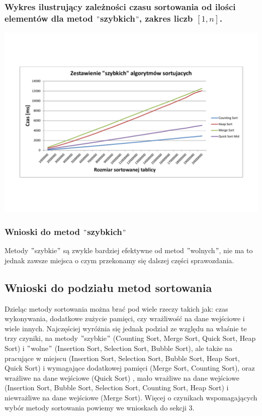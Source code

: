 \documentclass[polish,polish,a4paper]{article}
\begin{document}
\begin{spacing}{1.5}
\subsubsection*{Wykres ilustrujący zależności czasu sortowania od ilości elementów dla metod $"$szybkich$"$, zakres liczb $ [1,n] $.}

	\begin{minipage}[H]{\textwidth}
	\begin{center}
		\includegraphics[scale=0.6]{zad2szybkie.pdf}
		\label{fig:zad2szybkie}
	\end{center}
\end{minipage}

\subsubsection{Wnioski do metod $"$szybkich$"$}

Metody $"$szybkie$"$ są zwykle bardziej efektywne od metod $"$wolnych$"$, nie ma to jednak zawsze miejsca o czym przekonamy się dalszej części sprawozdania.


\subsection{Wnioski do podziału metod sortowania}

Dzieląc metody sortowania można brać pod wiele rzeczy takich jak: czas wykonywania, dodatkowe zużycie pamięci, czy wrażliwość na dane wejściowe i wiele innych. Najczęściej wyróżnia się jednak podział ze względu na właśnie te trzy czyniki, na metody $ " $szybkie$ " $ (Counting Sort, Merge Sort, Quick Sort, Heap Sort) i $"$wolne$"$ (Insertion Sort, Selection Sort, Bubble Sort), ale także na pracujące w miejscu (Insertion Sort, Selection Sort, Bubble Sort, Heap Sort, Quick Sort) i wymagające dodatkowej pamięci (Merge Sort, Counting Sort), oraz wrażliwe na dane wejściowe (Quick Sort) , mało wrażliwe na dane wejściowe (Insertion Sort, Bubble Sort, Selection Sort, Counting Sort, Heap Sort) i niewrażliwe na dane wejściowe (Merge Sort). Więcej o czynikach wspomagających wybór metody sortowania powiemy we wnioskach do sekcji 3.



\end{spacing}
\end{document}
